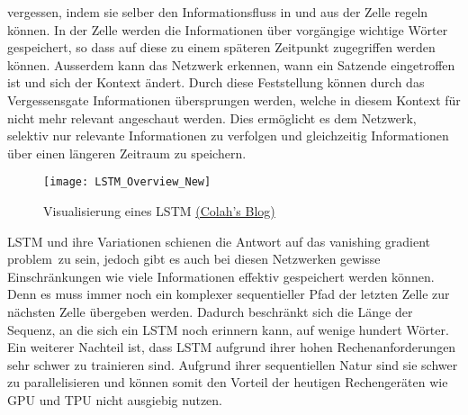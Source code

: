 vergessen, indem sie selber den Informationsfluss in und aus der Zelle regeln können. In der Zelle werden die
Informationen über vorgängige wichtige Wörter gespeichert, so dass auf diese zu einem späteren Zeitpunkt zugegriffen
werden können. Ausserdem kann das Netzwerk erkennen, wann ein Satzende eingetroffen ist und sich der Kontext ändert.
Durch diese Feststellung können durch das Vergessensgate Informationen übersprungen werden, welche in diesem Kontext für
nicht mehr relevant angeschaut werden. Dies ermöglicht es dem Netzwerk, selektiv nur relevante Informationen zu
verfolgen und gleichzeitig Informationen über einen längeren Zeitraum zu speichern.
\newline
\begin{figure}[H]
	\centering
	\texttt{[image: LSTM\_Overview\_New]}
	\caption{Visualisierung eines LSTM \href{http://colah.github.io/posts/2015-08-Understanding-LSTMs}{(Colah's Blog)}}
	\label{fig:LSTM-Overview}
\end{figure}
\noindent
\gls{LSTM} und ihre Variationen schienen die Antwort auf das \flqq vanishing gradient problem\frqq \ zu sein, jedoch gibt es
auch bei diesen Netzwerken gewisse Einschränkungen wie viele Informationen effektiv gespeichert werden können. Denn es
muss immer noch ein komplexer sequentieller Pfad der letzten Zelle zur nächsten Zelle übergeben werden. Dadurch
beschränkt sich die Länge der Sequenz, an die sich ein \gls{LSTM} noch erinnern kann, auf wenige hundert Wörter.
\newline
\newline
Ein weiterer Nachteil ist, dass \gls{LSTM} aufgrund ihrer hohen Rechenanforderungen sehr schwer zu trainieren sind. Aufgrund
ihrer sequentiellen Natur sind sie schwer zu parallelisieren und können somit den Vorteil der heutigen Rechengeräten wie
\gls{GPU} und \gls{TPU} nicht ausgiebig nutzen.

